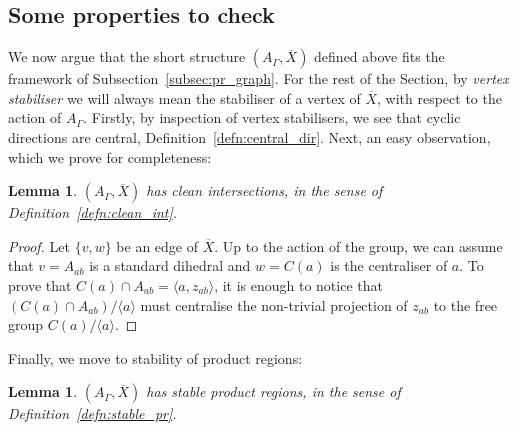 \documentclass[svgnames]{amsart}
\theoremstyle{plain}
\newtheorem{lemma}[thm]{Lemma}
\theoremstyle{definition}
\newcommand{\ov}[1]{\overline{#1}}
\begin{document}
\subsection{Some properties to check}
We now argue that the short structure $(A_\Gamma, \ov{X})$ defined above fits the framework of Subsection~\ref{subsec:pr_graph}. For the rest of the Section, by \emph{vertex stabiliser} we will always mean the stabiliser of a vertex of $\ov X$, with respect to the action of $A_\Gamma$. Firstly, by inspection of vertex stabilisers, we see that cyclic directions are central, Definition~\ref{defn:central_dir}. Next, an easy observation, which we prove for completeness:

\begin{lemma}
    $(A_\Gamma, \ov{X})$ has clean intersections, in the sense of Definition~\ref{defn:clean_int}.
\end{lemma}
\begin{proof}
    Let $\{v,w\}$ be an edge of $\ov X$. Up to the action of the group, we can assume that $v=A_{ab}$ is a standard dihedral and $w=C(a)$ is the centraliser of $a$. To prove that $C(a)\cap A_{ab}=\langle a, z_{ab}\rangle$, it is enough to notice that $(C(a)\cap A_{ab})/\langle a\rangle$ must centralise the non-trivial projection of $z_{ab}$ to the free group $C(a)/\langle a\rangle$.
\end{proof}

Finally, we move to stability of product regions:

\begin{lemma}
\label{lem:central_ext_peripheral_plus}
$(A_\Gamma, \ov X)$ has stable product regions, in the sense of Definition~\ref{defn:stable_pr}.
\end{lemma}
\end{document}
